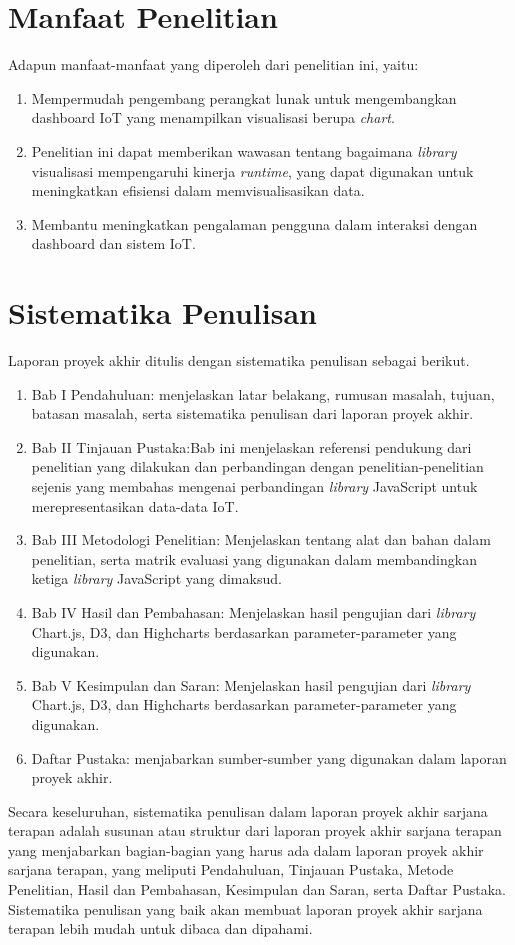 \section{Manfaat Penelitian}
Adapun manfaat-manfaat yang diperoleh dari penelitian ini, yaitu:
\begin{enumerate}
    \item Mempermudah pengembang perangkat lunak untuk mengembangkan dashboard IoT yang menampilkan visualisasi berupa \textit{chart}. 
    \item Penelitian ini dapat memberikan wawasan tentang bagaimana \textit{library} visualisasi mempengaruhi kinerja \textit{runtime}, yang dapat digunakan untuk meningkatkan efisiensi dalam memvisualisasikan data.
    \item Membantu meningkatkan pengalaman pengguna dalam interaksi dengan dashboard dan sistem IoT.
\end{enumerate}

\section{Sistematika Penulisan}
Laporan proyek akhir ditulis dengan sistematika penulisan sebagai berikut.
\begin{enumerate}
    \item Bab I Pendahuluan: menjelaskan latar belakang, rumusan masalah, tujuan, batasan masalah, serta sistematika penulisan dari laporan proyek akhir.
    \item Bab II Tinjauan Pustaka:Bab ini menjelaskan referensi pendukung dari penelitian yang dilakukan dan perbandingan dengan penelitian-penelitian sejenis yang membahas mengenai perbandingan \textit{library} JavaScript untuk merepresentasikan data-data IoT. 
    \item Bab III Metodologi Penelitian: Menjelaskan tentang alat dan bahan dalam penelitian, serta matrik evaluasi yang digunakan dalam membandingkan ketiga \textit{library} JavaScript yang dimaksud.  
    \item Bab IV Hasil dan Pembahasan: Menjelaskan hasil pengujian dari \textit{library} Chart.js, D3, dan Highcharts berdasarkan parameter-parameter yang digunakan.
    \item Bab V Kesimpulan dan Saran: Menjelaskan hasil pengujian dari \textit{library} Chart.js, D3, dan Highcharts berdasarkan parameter-parameter yang digunakan.
    \item Daftar Pustaka: menjabarkan sumber-sumber yang digunakan dalam laporan proyek akhir.
\end{enumerate}

Secara keseluruhan, sistematika penulisan dalam laporan proyek akhir sarjana terapan adalah susunan atau struktur dari laporan proyek akhir sarjana terapan yang menjabarkan bagian-bagian yang harus ada dalam laporan proyek akhir sarjana terapan, yang meliputi Pendahuluan, Tinjauan Pustaka, Metode Penelitian, Hasil dan Pembahasan, Kesimpulan dan Saran, serta Daftar Pustaka. Sistematika penulisan yang baik akan membuat laporan proyek akhir sarjana terapan lebih mudah untuk dibaca dan dipahami.